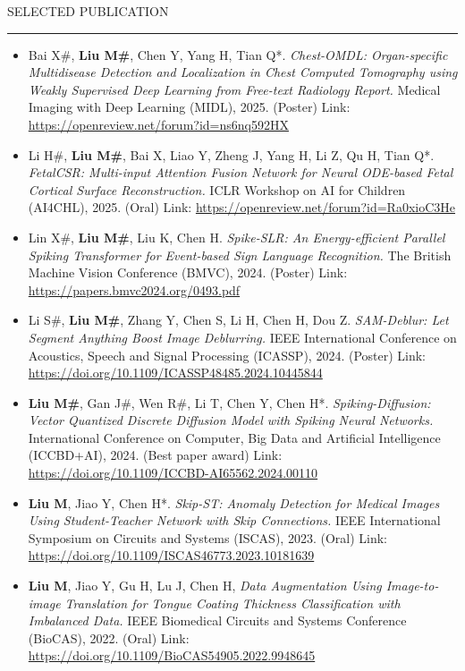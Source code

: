 \documentclass{resume} %
\renewenvironment{rSection}[1]{
\sectionskip
\textcolor{TsinghuaPurple}{\MakeUppercase{#1}}
\sectionlineskip
\hrule
\begin{list}{}{
\setlength{\leftmargin}{0em}
}
\item[]
}{
\end{list}
}
\begin{document}
\begin{rSection}{Selected Publication}
\begin{itemize}
    \item Bai X\#, \textbf{Liu M\#}, Chen Y, Yang H, Tian Q*. \textit{Chest-OMDL: Organ-specific Multidisease Detection and Localization in Chest Computed Tomography using Weakly Supervised Deep Learning from Free-text Radiology Report.} Medical Imaging with Deep Learning (MIDL), 2025. (Poster) Link: \url{https://openreview.net/forum?id=ns6nq592HX}

    \item Li H\#, \textbf{Liu M\#}, Bai X, Liao Y, Zheng J, Yang H, Li Z, Qu H, Tian Q*. \textit{FetalCSR: Multi-input Attention Fusion Network for Neural ODE-based Fetal Cortical Surface Reconstruction.} ICLR Workshop on AI for Children (AI4CHL), 2025. (Oral) Link: \url{https://openreview.net/forum?id=Ra0xioC3He}

    \item Lin X\#, \textbf{Liu M\#}, Liu K, Chen H. \textit{Spike-SLR: An Energy-efficient Parallel Spiking Transformer for Event-based Sign Language Recognition.} The British Machine Vision Conference (BMVC), 2024. (Poster) Link: \url{https://papers.bmvc2024.org/0493.pdf} 

    \item Li S\#, \textbf{Liu M\#}, Zhang Y, Chen S, Li H, Chen H, Dou Z. \textit{SAM-Deblur: Let Segment Anything Boost Image Deblurring.} IEEE International Conference on Acoustics, Speech and Signal Processing (ICASSP), 2024. (Poster) Link: \url{https://doi.org/10.1109/ICASSP48485.2024.10445844}

    \item \textbf{Liu M\#}, Gan J\#, Wen R\#, Li T, Chen Y, Chen H*. \textit{Spiking-Diffusion: Vector Quantized Discrete Diffusion Model with Spiking Neural Networks.} International Conference on Computer, Big Data and Artificial Intelligence (ICCBD+AI), 2024. (Best paper award) Link: \url{https://doi.org/10.1109/ICCBD-AI65562.2024.00110}

    \item \textbf{Liu M}, Jiao Y, Chen H*. \textit{Skip-ST: Anomaly Detection for Medical Images Using Student-Teacher Network with Skip Connections.} IEEE International Symposium on Circuits and Systems (ISCAS), 2023. (Oral) Link: \url{https://doi.org/10.1109/ISCAS46773.2023.10181639}

    \item \textbf{Liu M}, Jiao Y, Gu H, Lu J, Chen H, \textit{Data Augmentation Using Image-to-image Translation for Tongue Coating Thickness Classification with Imbalanced Data.} IEEE Biomedical Circuits and Systems Conference (BioCAS), 2022. (Oral) Link: \url{https://doi.org/10.1109/BioCAS54905.2022.9948645}
\end{itemize}


\end{rSection}
\end{document}
